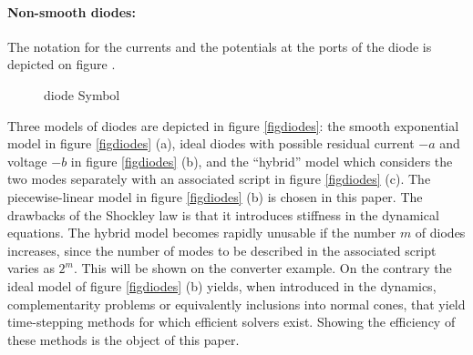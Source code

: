 \documentclass{article}
\begin{document}
\paragraph{Non-smooth  diodes:}  The notation for the currents and the potentials at the ports of
the diode is depicted on figure \cite{fig:DIODE}.

\begin{figure}
  \centering
  
  \caption{diode Symbol}
  \label{fig:DIODE}
\end{figure}


Three models of diodes are depicted in figure \ref{figdiodes}: the smooth exponential model in figure \ref{figdiodes} (a), ideal diodes with possible residual current $-a$ and voltage $-b$ in figure \ref{figdiodes} (b), and the ``hybrid'' model which considers the two modes separately with an associated script in figure \ref{figdiodes} (c). The piecewise-linear model in figure  \ref{figdiodes} (b) is chosen in this paper. The drawbacks of the Shockley law is that it introduces stiffness in the dynamical equations. The hybrid model becomes rapidly unusable if the number $m$ of diodes increases, since the number of modes to be described in the associated script varies as $2^{m}$. This will be shown on the converter example. On the contrary the ideal model of figure  \ref{figdiodes} (b) yields, when introduced in the dynamics, complementarity problems or equivalently inclusions into normal cones, that yield time-stepping methods for which efficient solvers exist. Showing the efficiency of these methods is the object of this paper.
\end{document}
